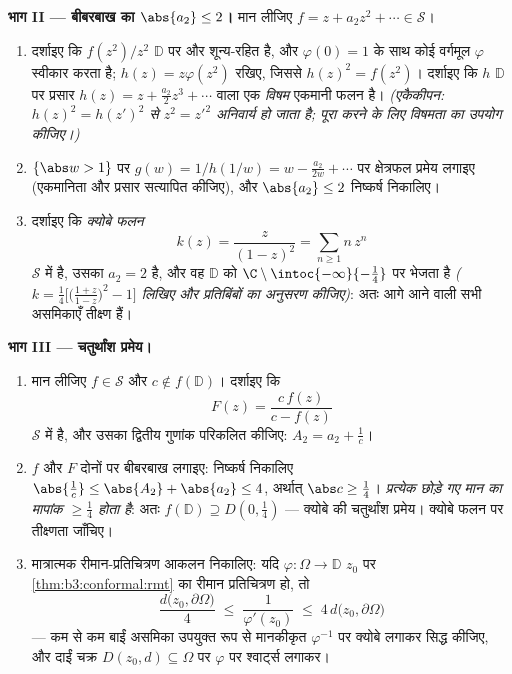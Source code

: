 \begin{problem}
\medskip
\noindent\textbf{भाग II --- बीबरबाख का $\abs{a_2} \leq
2$।} मान लीजिए $f = z + a_2z^2 + \cdots \in \mathcal S$।
\begin{enumerate}[resume]
  \item दर्शाइए कि $f(z^2)/z^2$ $\mathbb D$ पर  और शून्य-रहित है,
        और $\varphi(0) = 1$ के साथ कोई  वर्गमूल $\varphi$ स्वीकार करता
        है; $h(z) =
        z\varphi(z^2)$ रखिए, जिससे $h(z)^2 = f(z^2)$। दर्शाइए कि $h$ $\mathbb
        D$ पर
        प्रसार $h(z) = z + \frac{a_2}2z^3 +
        \cdots$ वाला एक \emph{विषम} एकमानी फलन है।
        \emph{(एकैकीपन: $h(z)^2 = h(z')^2$ से $z^2 = z'^2$ अनिवार्य हो जाता है; पूरा
        करने के लिए विषमता का उपयोग कीजिए।)}
  \item $\{\abs w > 1\}$ पर $g(w) = 1/h(1/w) = w -
        \frac{a_2}{2w} + \cdots$ पर क्षेत्रफल प्रमेय लगाइए (एकमानिता और
        प्रसार सत्यापित कीजिए), और $\abs{a_2} \leq 2$ निष्कर्ष निकालिए।
  \item दर्शाइए कि \emph{क्योबे फलन}
        \[
        k(z) = \frac{z}{(1 - z)^2} = \sum_{n\geq1}n\,z^n
        \]
        $\mathcal S$ में है, उसका $a_2 = 2$ है, और वह $\mathbb D$ को $\C\setminus\intoc{-\infty}{-\frac14}$ पर
        भेजता है \emph{($k = \frac14\bigl[\bigl(\frac{1+z}{1 -
        z}\bigr)^2 - 1\bigr]$ लिखिए और प्रतिबिंबों का अनुसरण
        कीजिए)}: अतः आगे आने वाली सभी असमिकाएँ तीक्ष्ण हैं।
\end{enumerate}

\medskip
\noindent\textbf{भाग III --- चतुर्थांश प्रमेय।}
\begin{enumerate}[resume]
  \item मान लीजिए $f \in \mathcal S$ और $c \notin f(\mathbb D)$। दर्शाइए कि
        \[
        F(z) = \frac{c\,f(z)}{c - f(z)}
        \]
        $\mathcal S$ में है, और उसका द्वितीय गुणांक परिकलित कीजिए:
        $A_2 = a_2 + \frac1c$।
  \item $f$ और $F$ दोनों पर बीबरबाख लगाइए: निष्कर्ष निकालिए
        $\abs{\frac1c} \leq \abs{A_2} + \abs{a_2} \leq 4$, अर्थात् $\abs c \geq \frac14$। \emph{प्रत्येक छोड़े गए मान का
        मापांक $\geq \frac14$ होता है}: अतः $f(\mathbb D) \supseteq
        D(0, \frac14)$ --- क्योबे की चतुर्थांश
        प्रमेय। क्योबे फलन पर तीक्ष्णता जाँचिए।
  \item मात्रात्मक रीमान-प्रतिचित्रण आकलन निकालिए: यदि $\varphi \colon \Omega \to \mathbb D$
        $z_0$ पर \cref{thm:b3:conformal:rmt} का रीमान प्रतिचित्रण हो, तो
        \[
        \frac{d\bigl(z_0, \partial\Omega\bigr)}{4}
        \;\leq\; \frac1{\varphi'(z_0)} \;\leq\;
        4\,d\bigl(z_0, \partial\Omega\bigr)
        \]
        --- कम से कम बाईं असमिका उपयुक्त रूप से मानकीकृत $\varphi^{-1}$ पर
        क्योबे लगाकर सिद्ध कीजिए, और दाईं चक्र $D(z_0, d) \subseteq \Omega$ पर $\varphi$ पर
        श्वार्ट्स लगाकर।
\end{enumerate}


\end{problem}
